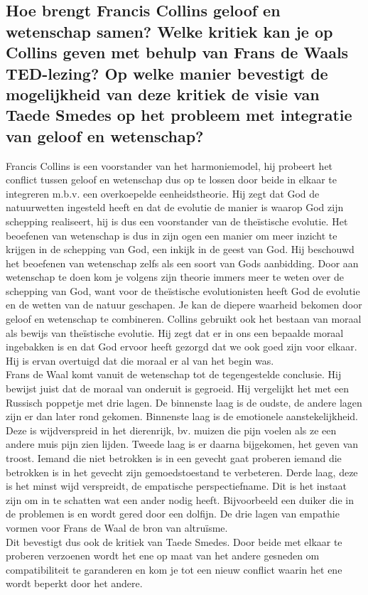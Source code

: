 \documentclass[11pt,a4paper,titlepage]{article}
\begin{document}
\subsection{Hoe brengt Francis Collins geloof en wetenschap samen? Welke kritiek kan je op Collins geven met behulp van Frans de Waals TED-lezing? Op welke manier bevestigt de mogelijkheid van deze kritiek de visie van Taede Smedes op het probleem met integratie van geloof en wetenschap? }
Francis Collins is een voorstander van het harmoniemodel, hij probeert het conflict tussen geloof en wetenschap dus op te lossen door beide in elkaar te integreren m.b.v. een overkoepelde eenheidstheorie. Hij zegt dat God de natuurwetten ingesteld heeft en dat de evolutie de manier is waarop God zijn schepping realiseert, hij is dus een voorstander van de theïstische evolutie. Het beoefenen van wetenschap is dus in zijn ogen een manier om meer inzicht te krijgen in de schepping van God, een inkijk in de geest van God. Hij beschouwd het beoefenen van wetenschap zelfs als een soort van Gods aanbidding. Door aan wetenschap te doen kom je volgens zijn theorie immers meer te weten over de schepping van God, want voor de theïstische evolutionisten heeft God de evolutie en de wetten van de natuur geschapen. Je kan de diepere waarheid bekomen door geloof en wetenschap te combineren. Collins gebruikt ook het bestaan van moraal als bewijs van theïstische evolutie. Hij zegt dat er in ons een bepaalde moraal ingebakken is en dat  God ervoor heeft gezorgd dat we ook goed zijn voor elkaar. Hij is ervan overtuigd dat die moraal er al van het begin was. \\
Frans de Waal komt vanuit de wetenschap tot de tegengestelde conclusie. Hij bewijst juist dat de moraal van onderuit is gegroeid. Hij vergelijkt het met een Russisch poppetje met drie lagen. De binnenste laag is de oudste, de andere lagen zijn er dan later rond gekomen. Binnenste laag is de emotionele aanstekelijkheid. Deze is wijdverspreid in het dierenrijk, bv. muizen die pijn voelen als ze een andere muis pijn zien lijden. Tweede laag is er daarna bijgekomen, het geven van troost. Iemand die niet betrokken is in een gevecht gaat proberen iemand die betrokken is in het gevecht zijn gemoedstoestand te verbeteren. Derde laag, deze is het minst wijd verspreidt, de empatische perspectiefname. Dit is het instaat zijn om in te schatten wat een ander nodig heeft. Bijvoorbeeld een duiker die in de problemen is en wordt gered door een dolfijn. De drie lagen van empathie vormen voor Frans de Waal de bron van altruïsme. \\
Dit bevestigt dus ook de kritiek van Taede Smedes. Door beide met elkaar te proberen verzoenen wordt het ene op maat van het andere gesneden om compatibiliteit te garanderen en kom je tot een nieuw conflict waarin het ene wordt beperkt door het andere.
\end{document}
